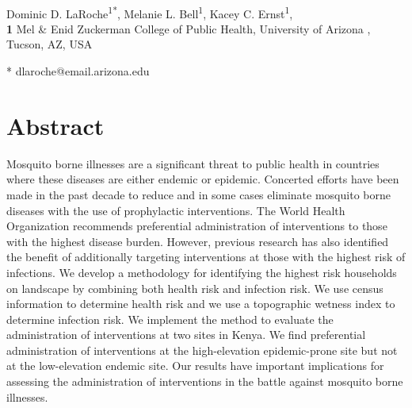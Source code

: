 \documentclass[10pt,letterpaper]{article}\usepackage[]{graphicx}\usepackage[]{color}
\date{}
\begin{document}
\vspace*{0.2in}
\begin{flushleft}
{\Large
\textbf{} %
}
\newline
\\
Dominic D. LaRoche\textsuperscript{1*},
Melanie L. Bell\textsuperscript{1},
Kacey C. Ernst\textsuperscript{1},
\\
\bigskip
\textbf{1} Mel \& Enid Zuckerman College of Public Health, University of Arizona , Tucson, AZ, USA
\\
\bigskip

* dlaroche@email.arizona.edu

\end{flushleft}






\section*{Abstract}
Mosquito borne illnesses are a significant threat to public health in countries where these diseases are either endemic or epidemic. Concerted efforts have been made in the past decade to reduce and in some cases eliminate mosquito borne diseases with the use of prophylactic interventions. The World Health Organization recommends preferential administration of interventions to those with the highest disease burden. However,  previous research has also identified the benefit of additionally targeting interventions at those with the highest risk of infections. We develop a methodology for identifying the highest risk households on landscape by combining both health risk and infection risk.  We use census information to determine health risk and we use a topographic wetness index to determine infection risk.  We implement the method to evaluate the administration of interventions at two sites in Kenya. We find preferential administration of interventions at the high-elevation epidemic-prone site but not at the low-elevation endemic site. Our results have important implications for assessing the administration of interventions in the battle against mosquito borne illnesses.
\end{document}
